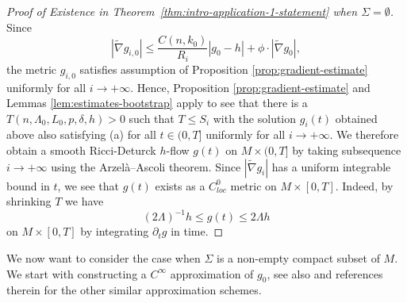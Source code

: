 \documentclass[12pt]{amsart}
\theoremstyle{plain}
\theoremstyle{plain}
\theoremstyle{definition}
\theoremstyle{remark}
\numberwithin{equation}{subsection}
\newcommand{\hdel}{\tilde{\nabla}}
\begin{document}
\begin{proof}[Proof of Existence in Theorem~\ref{thm:intro-application-1-statement} when $\Sigma=\emptyset$]
Since 
\begin{equation}
|\hdel g_{i,0}|\leq \frac{C(n,k_0)}{R_i}|g_0-h|+\phi\cdot |\hdel g_0|,
\end{equation}
the metric $g_{i,0}$ satisfies assumption of  Proposition \ref{prop:gradient-estimate} uniformly for all $i\to+\infty$. Hence, Proposition \ref{prop:gradient-estimate} and Lemmas \ref{lem:estimates-bootstrap} apply to see that there is a $T(n, \Lambda_0, L_0, p, \delta,h) > 0$ such that $T \leq S_i$ with the solution $g_i(t)$ obtained above also satisfying (a) for all $t \in (0, T]$ uniformly for all $i\to+\infty$. We therefore obtain a smooth Ricci-Deturck $h$-flow $g(t)$ on $M\times (0,T]$ by taking subsequence $i\to+\infty$ using  the Arzel\`a--Ascoli theorem. Since $|\hdel g_i|$ has a uniform integrable bound in $t$, we see that $g(t)$ exists as a $C^0_{loc}$ metric on $M\times [0,T]$. Indeed, by shrinking $T$ we have 
\begin{equation}
(2\Lambda)^{-1}h\leq g(t)\leq 2\Lambda h
\end{equation}
on $M\times [0,T]$ by integrating $\partial_t g$ in time.  
\end{proof}


We now want to consider the case when $\Sigma$ is a non-empty compact subset of $M$. We start with constructing a $C^\infty$ approximation of $g_0$, see also \cite{lee_positive_2013,shi_scalar_2016,
lee_continuous_2021,grant_positive_2014} and references therein for the other similar approximation schemes.
\end{document}
